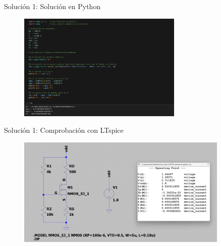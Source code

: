 \documentclass[t,aspectratio=169]{beamer}
\begin{document}
\begin{frame}{Solución 1: Solución en Python}

\begin{figure}
    \centering
    \includegraphics[width=0.7\textwidth]{figuras/python_ejemplo_1.png}
\end{figure}
    
\end{frame}


\begin{frame}{Solución 1: Comprobación con LTspice}

\begin{figure}
    \centering
    \includegraphics[width=0.9\textwidth]{figuras/ltspice_ejemplo_1.png}
\end{figure}
    
\end{frame}
\end{document}
